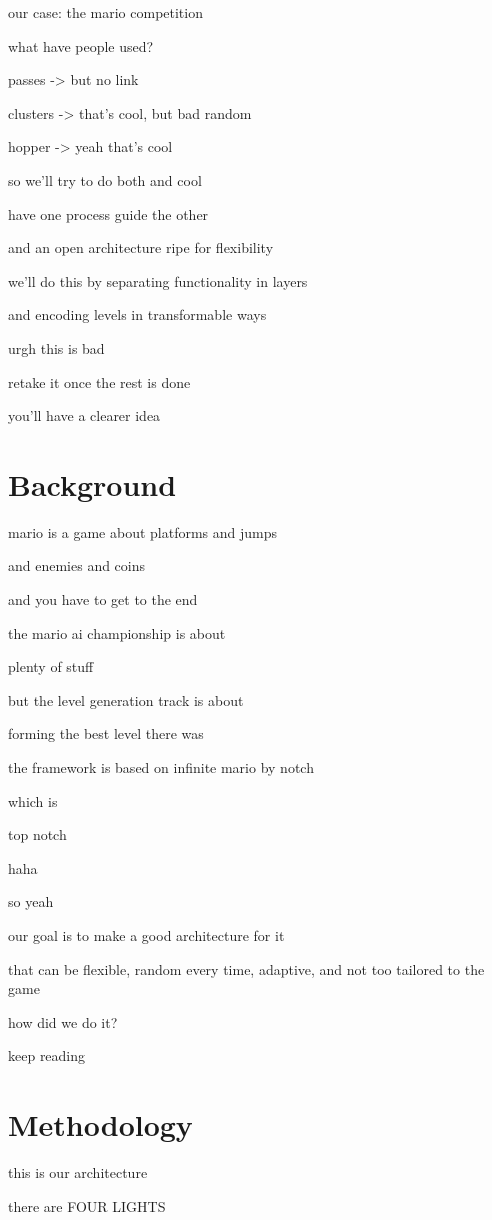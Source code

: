 \documentclass[conference]{IEEEtran}
\begin{document}
our case: the mario competition

what have people used?

passes -> but no link

clusters -> that's cool, but bad random

hopper -> yeah that's cool

so we'll try to do both and cool

have one process guide the other

and an open architecture ripe for flexibility

we'll do this by separating functionality in layers

and encoding levels in transformable ways

urgh this is bad

retake it once the rest is done

you'll have a clearer idea

\section{Background}

mario is a game about platforms and jumps

and enemies and coins

and you have to get to the end

the mario ai championship is about

plenty of stuff

but the level generation track is about

forming the best level there was

the framework is based on infinite mario by notch

which is

top notch

haha

so yeah

our goal is to make a good architecture for it

that can be flexible, random every time, adaptive, and not too tailored to the game

how  did we do it?

keep reading

\section{Methodology}

this is our architecture

there are FOUR LIGHTS
\end{document}
